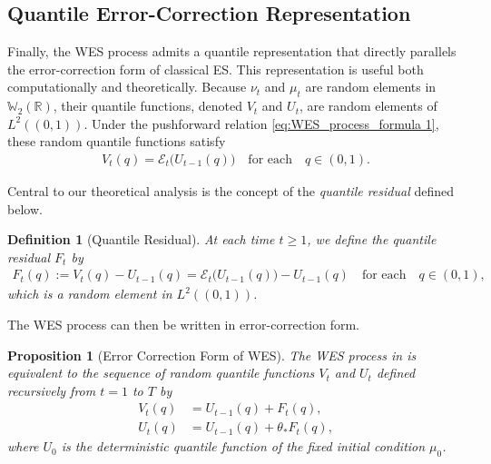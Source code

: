 \documentclass[a4paper, 11pt]{article}
\newcommand{\R}{\mathbb{R}}
\newcommand{\T}{\mathcal E}
\newtheorem{proposition}{Proposition}
\newtheorem{definition}{Definition}
\theoremstyle{definition}
\begin{document}
\subsection{Quantile Error-Correction Representation} \label{sec:WES_error_correction_form}

Finally, the WES process admits a quantile representation that directly parallels the error-correction form of classical ES.
This representation is useful both computationally and theoretically.
Because $\nu_t$ and $\mu_t$ are random elements in $\mathbb{W}_2(\R)$, their quantile functions, denoted $V_t$ and $U_t$, are random elements of $L^2((0,1))$.
Under the pushforward relation \eqref{eq:WES_process_formula 1}, these random quantile functions satisfy
\begin{align}
    V_t(q) = \T_t\big( U_{t-1}(q) \big) \quad \text{for each} \quad q\in(0,1) . 
\end{align}

Central to our theoretical analysis is the concept of the \emph{quantile residual} defined below.

\begin{definition}[Quantile Residual] \label{def:quantile_residual}
	At each time $t \ge 1$, we define the quantile residual $F_t$ by
	\begin{align}
        F_t(q) := V_t(q) - U_{t-1}(q) = \T_t\big( U_{t-1}(q) \big) - U_{t-1}(q) \quad \text{for each} \quad q \in (0, 1) , \label{eq:quantile residual}
	\end{align}
    which is a random element in $L^2((0,1))$.
\end{definition}

The WES process can then be written in error-correction form.

\begin{proposition}[Error Correction Form of WES] \label{lem:quantile_process}
    The WES process in  is equivalent to the sequence of random quantile functions $V_t$ and $U_t$ defined recursively from $t = 1$ to $T$ by
	\begin{align}
		V_t(q)  &= U_{t-1}(q) + F_t(q) , \label{eq:WES error correction form 1}\\
        U_t(q) &= U_{t-1}(q) + \theta_* F_{t}(q) , \label{eq:WES error correction form 2}
	\end{align}
	where $U_0$ is the deterministic quantile function of the fixed initial condition $\mu_0$.
\end{proposition}
\end{document}
